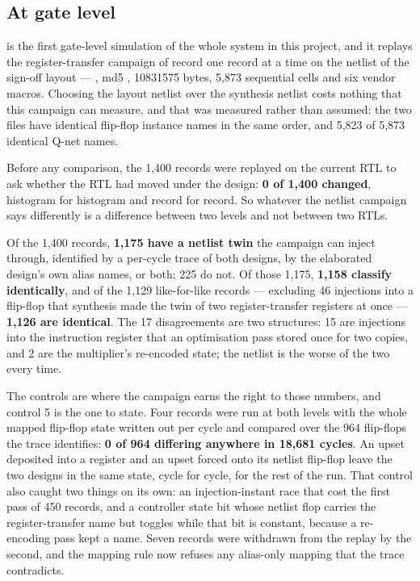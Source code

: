\subsection{At gate level}

 is the first gate-level simulation of the whole system in this
project, and it replays the register-transfer campaign of record one
record at a time on the netlist of the sign-off layout ---
, md5
, \num{10831575} bytes, 5,873 sequential cells and
six vendor macros. Choosing the layout netlist over the synthesis netlist
costs nothing that this campaign can measure, and that was measured
rather than assumed: the two files have identical flip-flop instance
names in the same order, and 5,823 of 5,873 identical Q-net names.

Before any comparison, the 1,400 records were replayed on the current RTL
to ask whether the RTL had moved under the design: \textbf{0 of 1,400
changed}, histogram for histogram and record for record. So whatever the
netlist campaign says differently is a difference between two levels and
not between two RTLs.

Of the 1,400 records, \textbf{1,175 have a netlist twin} the campaign can
inject through, identified by a per-cycle trace of both designs, by the
elaborated design's own alias names, or both; 225 do not. Of those 1,175,
\textbf{1,158 classify identically}, and of the 1,129 like-for-like
records --- excluding 46 injections into a flip-flop that synthesis made
the twin of two register-transfer registers at once --- \textbf{1,126 are
identical}. The 17 disagreements are two structures: 15 are injections
into the instruction register that an optimisation pass stored once for
two copies, and 2 are the multiplier's re-encoded state; the netlist is
the worse of the two every time.

The controls are where the campaign earns the right to those numbers,
and control 5 is the one to state. Four records were run at both levels
with the whole mapped flip-flop state written out per cycle and compared
over the 964 flip-flops the trace identifies: \textbf{0 of 964 differing
anywhere in 18,681 cycles}. An upset deposited into a register and an
upset forced onto its netlist flip-flop leave the two designs in the same
state, cycle for cycle, for the rest of the run. That control also caught
two things on its own: an injection-instant race that cost the first pass
of 450 records, and a controller state bit whose netlist flop carries the
register-transfer name but toggles while that bit is constant, because a
re-encoding pass kept a name. Seven records were withdrawn from the
replay by the second, and the mapping rule now refuses any alias-only
mapping that the trace contradicts.

